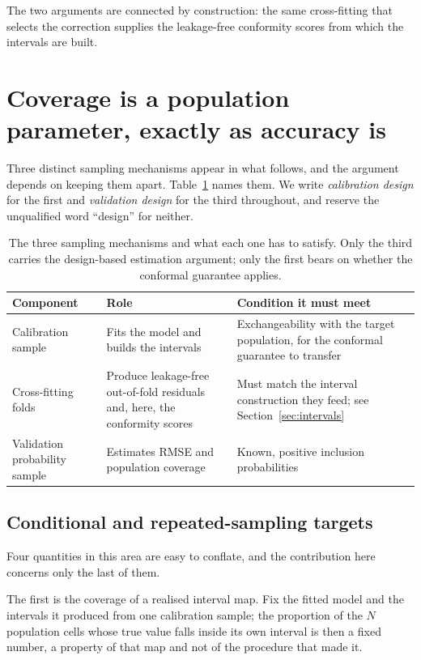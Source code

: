 \documentclass[preprint,12pt,authoryear]{elsarticle}
\begin{document}
The two arguments are connected by construction: the same cross-fitting that
selects the correction supplies the leakage-free conformity scores from which
the intervals are built.

\section{Coverage is a population parameter, exactly as accuracy is}
\label{sec:ht}

Three distinct sampling mechanisms appear in what follows, and the argument
depends on keeping them apart. Table~\ref{tab:designs} names them. We write
\emph{calibration design} for the first and \emph{validation design} for the
third throughout, and reserve the unqualified word ``design'' for neither.

\begin{table}[!ht]
\centering
\caption{The three sampling mechanisms and what each one has to satisfy. Only
the third carries the design-based estimation argument; only the first bears on
whether the conformal guarantee applies.}
\label{tab:designs}
\small
\begin{tabular}{p{}p{}p{}}
\toprule
Component & Role & Condition it must meet \\
\midrule
Calibration sample & Fits the model and builds the intervals &
Exchangeability with the target population, for the conformal guarantee to
transfer \\
Cross-fitting folds & Produce leakage-free out-of-fold residuals and, here,
the conformity scores & Must match the interval construction they feed; see
Section~\ref{sec:intervals} \\
Validation probability sample & Estimates RMSE and population coverage &
Known, positive inclusion probabilities \\
\bottomrule
\end{tabular}
\end{table}

\subsection{Conditional and repeated-sampling targets}
\label{sec:targets}

Four quantities in this area are easy to conflate, and the contribution here
concerns only the last of them.

The first is the coverage of a realised interval map. Fix the fitted model and
the intervals it produced from one calibration sample; the proportion of the $N$
population cells whose true value falls inside its own interval is then a fixed
number, a property of that map and not of the procedure that made it.
\end{document}
